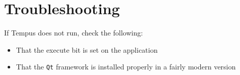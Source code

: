 \section{Troubleshooting}

If Tempus does not run, check the following:
\begin{itemize}
    \item That the execute bit is set on the application
    \item That the \texttt{Qt} framework is installed properly in a fairly modern version
\end{itemize}

